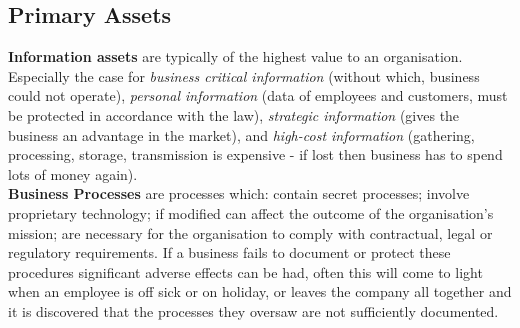 \documentclass[a4paper,11pt]{article}
\begin{document}
\subsection{Primary Assets}
\textbf{Information assets} are typically of the highest value to an organisation. Especially the case for \textit{business critical information} (without which, business could not operate), \textit{personal information} (data of employees and customers, must be protected in accordance with the law), \textit{strategic information} (gives the business an advantage in the market), and \textit{high-cost information} (gathering, processing, storage, transmission is expensive - if lost then business has to spend lots of money again).\\
\textbf{Business Processes} are processes which: contain secret processes; involve proprietary technology; if modified can affect the outcome of the organisation's mission; are necessary for the organisation to comply with contractual, legal or regulatory requirements. If a business fails to document or protect these procedures significant adverse effects can be had, often this will come to light when an employee is off sick or on holiday, or leaves the company all together and it is discovered that the processes they oversaw are not sufficiently documented.
\end{document}
